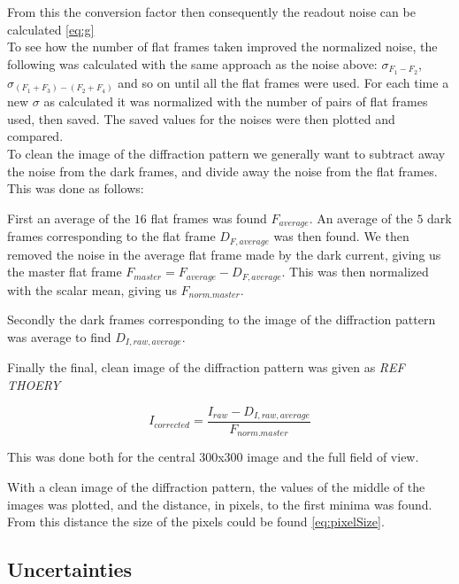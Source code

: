 \documentclass{emulateapj}
\begin{document}
From this the conversion factor then consequently the readout noise can be calculated \eqref{eq:g}\\

To see how the number of flat frames taken improved the normalized noise, the following was calculated with the same approach as the noise above:
$\sigma_{F_1-F_2}$, $\sigma_{(F_1 + F_3) - (F_2+F_4)}$ and so on until all the flat frames were used. For each time a new $\sigma$ as calculated it was normalized with the number of pairs of flat frames used, then saved. The saved values for the noises were then plotted and compared.\\

To clean the image of the diffraction pattern we generally want to subtract away the noise from the dark frames, and divide away the noise from the flat frames. This was done as follows:

First an average of the $16$ flat frames was found $F_{average}$. An average of the $5$ dark frames corresponding to the flat frame $D_{F,average}$ was then found. We then removed the noise in the average flat frame made by the dark current, giving us the master flat frame $F_{master} = F_{average}-D_{F,average}$. This was then normalized with the scalar mean, giving us $F_{norm. master}$.

Secondly the dark frames corresponding to the image of the diffraction pattern was average to find $D_{I,raw,average}$. 

Finally the final, clean image of the diffraction pattern was given as \emph{REF THOERY}

\begin{equation}
I_{corrected} = \frac{I_{raw} - D_{I,raw,average}}{F_{norm. master}}
\end{equation}

This was done both for the central 300x300 image and the full field of view.

With a clean image of the diffraction pattern, the values of the middle of the images was plotted, and the distance, in pixels, to the first minima was found. From this distance the size of the pixels could be found \eqref{eq:pixelSize}. 

\subsection{Uncertainties}
\end{document}
